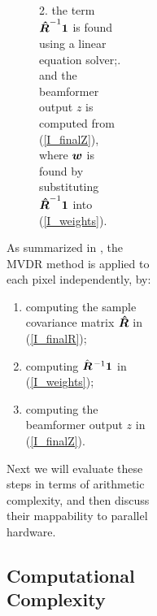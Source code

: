 \begin{figure}[htbp]
\begin{figure}[htbp]
\begin{figure}[tbp]
\begin{figure}[!t]
\begin{figure}[!t]
{2. the term $\boldsymbol{\hat R}^{-1}\boldsymbol{1}$ is found using a linear equation solver;. and the beamformer output $z$ is computed from (\ref{I_finalZ}), where $\boldsymbol{w}$ is found by substituting $\boldsymbol{\hat R}^{-1}\boldsymbol{1}$ into (\ref{I_weights}). } \label{I_mvdr_beamforming}
\end{figure}
As summarized in , the MVDR method is applied to each pixel independently, by:
\begin{enumerate}
\item computing the sample covariance matrix $\boldsymbol{\hat R}$ in (\ref{I_finalR});
\item computing $\hat{\boldsymbol{R}}\;\!^{-1}\boldsymbol{1}$ in (\ref{I_weights});
\item computing the beamformer output $z$ in (\ref{I_finalZ}).
\end{enumerate}
Next we will evaluate these steps in terms of arithmetic complexity, and then discuss their mappability to parallel hardware.

\subsection{Computational Complexity}

 


\end{figure}
\end{figure}
\end{figure}
\end{figure}
